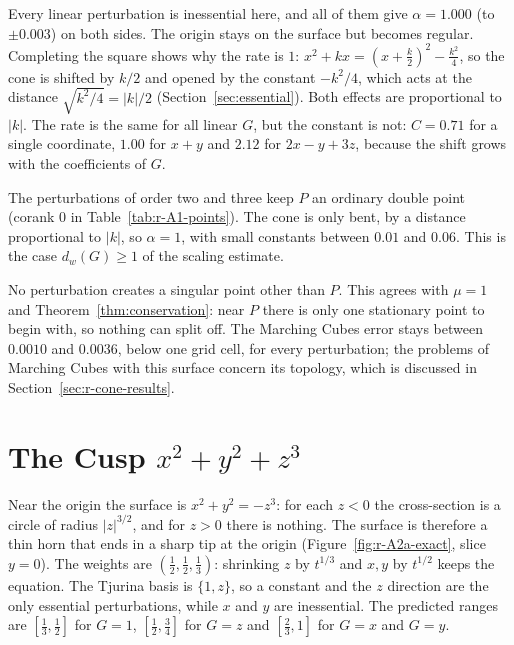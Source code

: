\documentclass[12pt, a4paper, oneside]{book}
\theoremstyle{plain}
\theoremstyle{definition}
\theoremstyle{remark}
\theoremstyle{definition}
\begin{document}
Every linear perturbation is inessential here, and all of them give $\alpha=1.000$ (to $\pm0.003$) on both sides. The origin stays on the surface but becomes regular. Completing the square shows why the rate is $1$: $x^2+kx=(x+\tfrac k2)^2-\tfrac{k^2}{4}$, so the cone is shifted by $k/2$ and opened by the constant $-k^2/4$, which acts at the distance $\sqrt{k^2/4}=|k|/2$ (Section~\ref{sec:essential}). Both effects are proportional to $|k|$. The rate is the same for all linear $G$, but the constant is not: $C=0.71$ for a single coordinate, $1.00$ for $x+y$ and $2.12$ for $2x-y+3z$, because the shift grows with the coefficients of $G$.

The perturbations of order two and three keep $P$ an ordinary double point (corank $0$ in Table~\ref{tab:r-A1-points}). The cone is only bent, by a distance proportional to $|k|$, so $\alpha=1$, with small constants between $0.01$ and $0.06$. This is the case $d_w(G)\ge1$ of the scaling estimate.

No perturbation creates a singular point other than $P$. This agrees with $\mu=1$ and Theorem~\ref{thm:conservation}: near $P$ there is only one stationary point to begin with, so nothing can split off. The Marching Cubes error stays between $0.0010$ and $0.0036$, below one grid cell, for every perturbation; the problems of Marching Cubes with this surface concern its topology, which is discussed in Section~\ref{sec:r-cone-results}.
\clearpage

\section{The Cusp $x^2+y^2+z^3$}
\label{sec:r-A2a}

Near the origin the surface is $x^2+y^2=-z^3$: for each $z<0$ the cross-section is a circle of radius $|z|^{3/2}$, and for $z>0$ there is nothing. The surface is therefore a thin horn that ends in a sharp tip at the origin (Figure~\ref{fig:r-A2a-exact}, slice $y=0$). The weights are $(\tfrac12,\tfrac12,\tfrac13)$: shrinking $z$ by $t^{1/3}$ and $x,y$ by $t^{1/2}$ keeps the equation. The Tjurina basis is $\{1,z\}$, so a constant and the $z$ direction are the only essential perturbations, while $x$ and $y$ are inessential. The predicted ranges are $[\tfrac13,\tfrac12]$ for $G=1$, $[\tfrac12,\tfrac34]$ for $G=z$ and $[\tfrac23,1]$ for $G=x$ and $G=y$.
\end{document}
